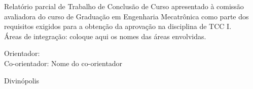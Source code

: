 \begin{center}
{\sc  \titulo}  %
\end{center}

\vspace*{2.5cm}

\begin{flushright}
\begin{minipage}{9.0cm}
Relatório parcial de Trabalho de Conclusão de Curso apresentado à
comissão avaliadora do curso de Graduação
em Engenharia Mecatrônica
como  parte dos requisitos exigidos para a obtenção da aprovação
na disciplina de TCC I.  \\
Áreas de integração: {coloque aqui os nomes das áreas envolvidas}.

\vspace*{1cm}

Orientador: \orientador \\
Co-orientador: Nome do co-orientador
\end{minipage}
\end{flushright}

\vspace*{2.5cm}


\null\vfill

\begin{center}
Divinópolis\\\ano  %
\end{center}

\thispagestyle{empty}

\newpage

\vspace*{1.2cm}
\begin{center}
\large \autor\\%
\end{center}


\vspace*{1.8cm}

\begin{center}
{\sc  \titulo}
\end{center}

